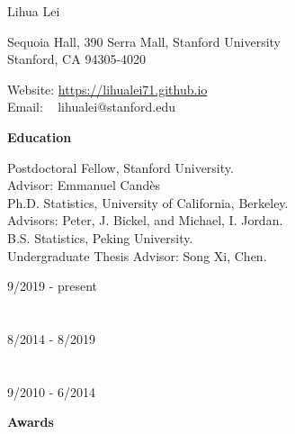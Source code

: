 \documentclass{article}
\begin{document}
\begin{Huge}
\noindent Lihua Lei
\end{Huge}

\vspace{5mm}
\begin{minipage}{0.6\linewidth}
  \flushleft
\noindent Sequoia Hall, 390 Serra Mall, Stanford University \\
\noindent Stanford, CA 94305-4020
\end{minipage}
\hfill
\begin{minipage}{0.4\linewidth}
  Website: \url{https://lihualei71.github.io}\\
  Email: \,\,\,\,\,lihualei@stanford.edu
\end{minipage}

\vspace{5mm}
\begin{large}
\noindent \textbf{Education}
\end{large}
\vspace{5mm}

\begin{minipage}{0.65\linewidth}
\noindent Postdoctoral Fellow, Stanford University.\\
Advisor: Emmanuel Cand\`{e}s\\

\noindent Ph.D. Statistics, University of California, Berkeley.\\
Advisors: Peter, J. Bickel, and Michael, I. Jordan.\\

\noindent B.S. Statistics, Peking University. \\
Undergraduate Thesis Advisor: Song Xi, Chen.
\end{minipage}\hfill
\begin{minipage}{0.34\linewidth}
\flushright
\vspace{-5mm}
9/2019 - present\\
~\\
~\\
8/2014 - 8/2019 \\
~\\
~\\
9/2010 - 6/2014\\
\end{minipage}

\vspace{5mm}
\begin{large}
\noindent \textbf{Awards}
\end{large}
\end{document}
